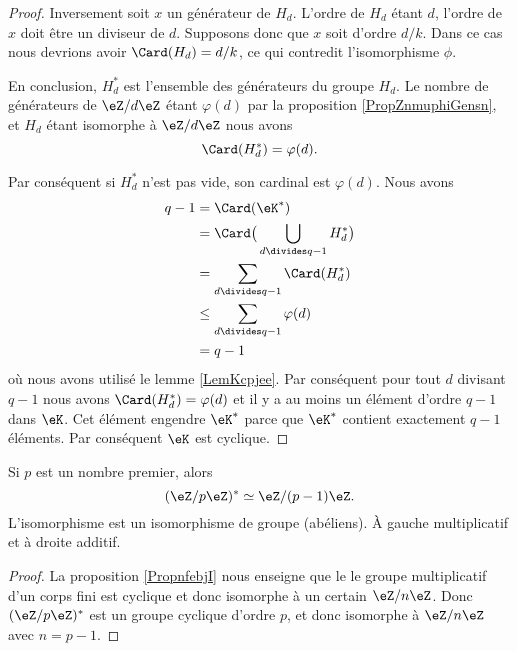 \begin{proof}
    Inversement soit \( x\) un générateur de \( H_d\). L'ordre de \( H_d\) étant \( d\), l'ordre de \( x\) doit être un diviseur de \( d\). Supposons donc que \( x\) soit d'ordre \( d/k\). Dans ce cas nous devrions avoir \( \Card(H_d)=d/k\), ce qui contredit l'isomorphisme \( \phi\).

    En conclusion, \( H^*_d\) est l'ensemble des générateurs du groupe \( H_d\). Le nombre de générateurs de \( \eZ/d\eZ\) étant \( \varphi(d)\) par la proposition \ref{PropZnmuphiGensn}, et \( H_d\) étant isomorphe à \( \eZ/d\eZ\) nous avons
    \begin{equation}
        \Card(H^*_d)=\varphi(d).
    \end{equation}
    
    Par conséquent si \( H^*_d\) n'est pas vide, son cardinal est \( \varphi(d)\). Nous avons 
    \begin{subequations}
        \begin{align}
            q-1&=\Card(\eK^*)\\
            &=\Card\big( \bigcup_{d\divides q-1}H^*_d \big)\\
            &=\sum_{d\divides q-1}\Card(H^*_d)\\
            &\leq \sum_{d\divides q-1}\varphi(d)\\
            &=q-1
        \end{align}
    \end{subequations}
    où nous avons utilisé le lemme \ref{LemKcpjee}. Par conséquent pour tout \( d\) divisant \( q-1\) nous avons \( \Card(H^*_d)=\varphi(d)\) et il y a au moins un élément d'ordre \( q-1\) dans \( \eK\). Cet élément engendre \( \eK^*\) parce que \( \eK^*\) contient exactement \( q-1\) éléments. Par conséquent \( \eK\) est cyclique.
\end{proof}

\begin{corollary}   \label{CorpRUndR}
    Si \( p\) est un nombre premier, alors 
    \begin{equation}
        (\eZ/p\eZ)^*\simeq\eZ/(p-1)\eZ.
    \end{equation}
    L'isomorphisme est un isomorphisme de groupe (abéliens). À gauche multiplicatif et à droite additif.
\end{corollary}

\begin{proof}
    La proposition \ref{PropnfebjI} nous enseigne que le le groupe multiplicatif d'un corps fini est cyclique et donc isomorphe à un certain \( \eZ/n\eZ\). Donc \( (\eZ/p\eZ)^*\) est un groupe cyclique d'ordre \( p\), et donc isomorphe à \( \eZ/n\eZ\) avec \( n=p-1\).
\end{proof}

